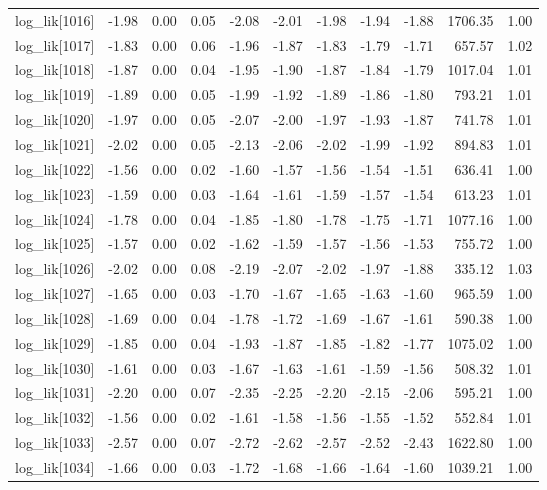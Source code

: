 \begin{table}[ht]
\begin{tabular}{rrrrrrrrrrr}
  log\_lik[1016] & -1.98 & 0.00 & 0.05 & -2.08 & -2.01 & -1.98 & -1.94 & -1.88 & 1706.35 & 1.00 \\ 
  log\_lik[1017] & -1.83 & 0.00 & 0.06 & -1.96 & -1.87 & -1.83 & -1.79 & -1.71 & 657.57 & 1.02 \\ 
  log\_lik[1018] & -1.87 & 0.00 & 0.04 & -1.95 & -1.90 & -1.87 & -1.84 & -1.79 & 1017.04 & 1.01 \\ 
  log\_lik[1019] & -1.89 & 0.00 & 0.05 & -1.99 & -1.92 & -1.89 & -1.86 & -1.80 & 793.21 & 1.01 \\ 
  log\_lik[1020] & -1.97 & 0.00 & 0.05 & -2.07 & -2.00 & -1.97 & -1.93 & -1.87 & 741.78 & 1.01 \\ 
  log\_lik[1021] & -2.02 & 0.00 & 0.05 & -2.13 & -2.06 & -2.02 & -1.99 & -1.92 & 894.83 & 1.01 \\ 
  log\_lik[1022] & -1.56 & 0.00 & 0.02 & -1.60 & -1.57 & -1.56 & -1.54 & -1.51 & 636.41 & 1.00 \\ 
  log\_lik[1023] & -1.59 & 0.00 & 0.03 & -1.64 & -1.61 & -1.59 & -1.57 & -1.54 & 613.23 & 1.01 \\ 
  log\_lik[1024] & -1.78 & 0.00 & 0.04 & -1.85 & -1.80 & -1.78 & -1.75 & -1.71 & 1077.16 & 1.00 \\ 
  log\_lik[1025] & -1.57 & 0.00 & 0.02 & -1.62 & -1.59 & -1.57 & -1.56 & -1.53 & 755.72 & 1.00 \\ 
  log\_lik[1026] & -2.02 & 0.00 & 0.08 & -2.19 & -2.07 & -2.02 & -1.97 & -1.88 & 335.12 & 1.03 \\ 
  log\_lik[1027] & -1.65 & 0.00 & 0.03 & -1.70 & -1.67 & -1.65 & -1.63 & -1.60 & 965.59 & 1.00 \\ 
  log\_lik[1028] & -1.69 & 0.00 & 0.04 & -1.78 & -1.72 & -1.69 & -1.67 & -1.61 & 590.38 & 1.00 \\ 
  log\_lik[1029] & -1.85 & 0.00 & 0.04 & -1.93 & -1.87 & -1.85 & -1.82 & -1.77 & 1075.02 & 1.00 \\ 
  log\_lik[1030] & -1.61 & 0.00 & 0.03 & -1.67 & -1.63 & -1.61 & -1.59 & -1.56 & 508.32 & 1.01 \\ 
  log\_lik[1031] & -2.20 & 0.00 & 0.07 & -2.35 & -2.25 & -2.20 & -2.15 & -2.06 & 595.21 & 1.00 \\ 
  log\_lik[1032] & -1.56 & 0.00 & 0.02 & -1.61 & -1.58 & -1.56 & -1.55 & -1.52 & 552.84 & 1.01 \\ 
  log\_lik[1033] & -2.57 & 0.00 & 0.07 & -2.72 & -2.62 & -2.57 & -2.52 & -2.43 & 1622.80 & 1.00 \\ 
  log\_lik[1034] & -1.66 & 0.00 & 0.03 & -1.72 & -1.68 & -1.66 & -1.64 & -1.60 & 1039.21 & 1.00 \\ 

\end{tabular}
\end{table}
